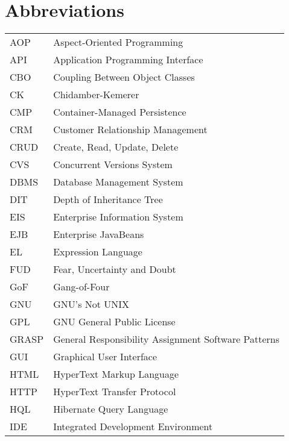 {
  \newpage
  \chapter*{Abbreviations}
  \label{toc:abbrev}
  \renewcommand\arraystretch{1.5}
  
  \begin{longtable}[!h]{@{}p{1.8cm}p{11cm}}

    AOP & Aspect-Oriented Programming\\
    API & Application Programming Interface\\
    CBO & Coupling Between Object Classes\\
    CK & Chidamber-Kemerer\\
    CMP & Container-Managed Persistence\\
    CRM & Customer Relationship Management\\
    CRUD & Create, Read, Update, Delete\\
    CVS & Concurrent Versions System\\
    DBMS & Database Management System\\
    DIT & Depth of Inheritance Tree\\
    EIS & Enterprise Information System\\
    EJB & Enterprise JavaBeans\\
    EL & Expression Language\\
    FUD & Fear, Uncertainty and Doubt\\
    GoF & Gang-of-Four\\
    GNU & GNU's Not UNIX\\
    GPL & GNU General Public License\\
    GRASP & General Responsibility Assignment Software Patterns\\
    GUI & Graphical User Interface\\
    HTML & HyperText Markup Language\\
    HTTP & HyperText Transfer Protocol\\
    HQL & Hibernate Query Language\\
    IDE & Integrated Development Environment\\

\end{longtable}}
